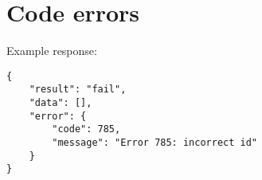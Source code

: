 \newpage
\section{Code errors}

Example response:  \\
\begin{Verbatim}[frame=single]
{
    "result": "fail",
    "data": [],
    "error": {
        "code": 785,
        "message": "Error 785: incorrect id"
    }
}
\end{Verbatim}


